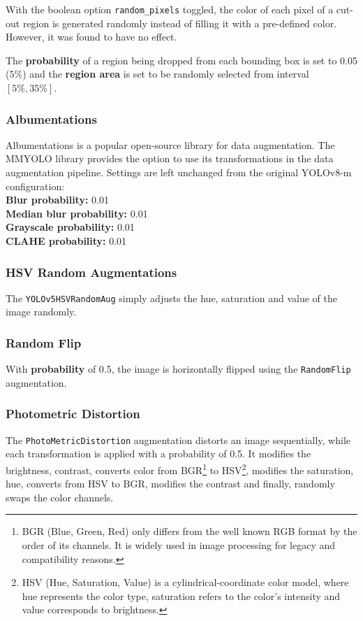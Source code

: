 With the boolean option \texttt{random\_pixels} toggled, the color of each pixel
of a cut-out region is generated randomly instead of filling it with a
pre-defined color. However, it was found to have no effect.

The \textbf{probability} of a region being dropped from each bounding box is set
to \num{0.05} ($5 \%$) and the \textbf{region area} is set to be randomly selected from
interval $[5\%, 35\%]$.

\subsubsection*{Albumentations}

Albumentations \cite{Albumentations} is a popular open-source library for data
augmentation. The MMYOLO library provides the option to use its transformations
in the data augmentation pipeline. Settings are left unchanged from the original
YOLOv8-m configuration: \\
\textbf{Blur probability:} 0.01 \\
\textbf{Median blur probability:} 0.01 \\
\textbf{Grayscale probability:} 0.01 \\
\textbf{CLAHE probability:} 0.01

\subsubsection*{HSV Random Augmentations}

The \texttt{YOLOv5HSVRandomAug} simply adjusts the hue, saturation and value of
the image randomly.

\subsubsection*{Random Flip}

With \textbf{probability} of 0.5, the image is horizontally flipped using the
\texttt{RandomFlip} augmentation.

\subsubsection*{Photometric Distortion}

The \texttt{PhotoMetricDistortion} augmentation distorts an image sequentially,
while each transformation is applied with a probability of 0.5. It modifies the
brightness, contrast, converts color from BGR\footnote{BGR (Blue, Green, Red)
only differs from the well known RGB format by the order of its channels. It is
widely used in image processing for legacy and compatibility reasons.} to
HSV\footnote{HSV (Hue, Saturation, Value) is a cylindrical-coordinate color
model, where hue represents the color type, saturation refers to the color's
intensity and value corresponds to brightness.}, modifies the saturation,
hue, converts from HSV to BGR, modifies the contrast and finally, randomly swaps
the color channels.

